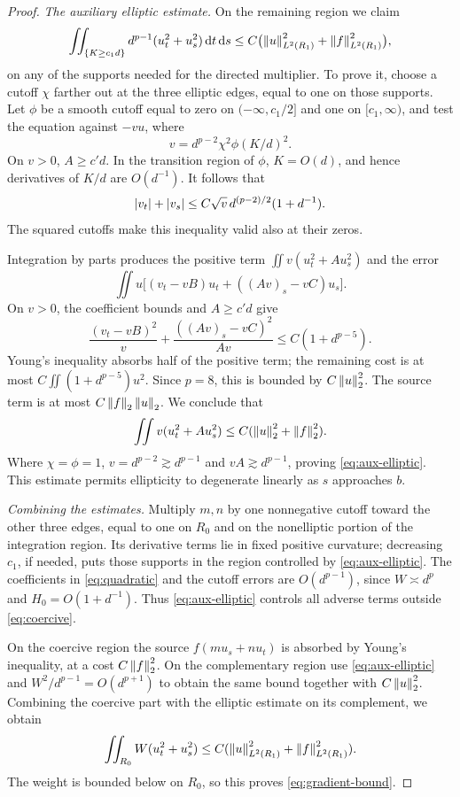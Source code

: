 \begin{proof}
\smallskip
\noindent\emph{The auxiliary elliptic estimate.}
On the remaining region we claim
\begin{equation}\label{eq:aux-elliptic}
\iint_{\{K\ge c_1d\}} d^{p-1}(u_t^2+u_s^2)\,\mathrm d t\,\mathrm d s
\le C\bigl(\left\lVert u\right\rVert_{L^2(R_1)}^2+\left\lVert f\right\rVert_{L^2(R_1)}^2\bigr),
\end{equation}
on any of the supports needed for the directed multiplier.
To prove it, choose a cutoff \(\chi\) farther out at the three
elliptic edges, equal to one on those supports. Let \(\phi\) be
a smooth cutoff equal to zero on \((-\infty,c_1/2]\) and one
on \([c_1,\infty)\), and test the equation against \(-vu\), where
\[
v=d^{p-2}\chi^2\phi(K/d)^2.
\]
On \(v>0\), \(A\ge c'd\). In the transition region of \(\phi\),
\(K=O(d)\), and hence derivatives of \(K/d\) are \(O(d^{-1})\).
It follows that
\[
\left\lvert v_t\right\rvert+\left\lvert v_s\right\rvert
\le C\sqrt v\,d^{(p-2)/2}(1+d^{-1}).
\]
The squared cutoffs make this inequality valid also at their zeros.

Integration by parts produces the positive term
\(\iint v(u_t^2+Au_s^2)\) and the error
\[
\iint u\bigl[(v_t-vB)u_t+((Av)_s-vC)u_s\bigr].
\]
On \(v>0\), the coefficient bounds and \(A\ge c'd\) give
\[
\frac{(v_t-vB)^2}{v}
+\frac{((Av)_s-vC)^2}{Av}
\le C(1+d^{p-5}).
\]
Young's inequality absorbs half of the positive term; the remaining
cost is at most \(C\iint(1+d^{p-5})u^2\).
Since \(p=8\), this is bounded by \(C\left\lVert u\right\rVert_2^2\).
The source term is at most \(C\left\lVert f\right\rVert_2\left\lVert u\right\rVert_2\).
We conclude that
\[
\iint v(u_t^2+Au_s^2)
\le C(\left\lVert u\right\rVert_2^2+\left\lVert f\right\rVert_2^2).
\]
Where \(\chi=\phi=1\), \(v=d^{p-2}\gtrsim d^{p-1}\)
and \(vA\gtrsim d^{p-1}\), proving \eqref{eq:aux-elliptic}.
This estimate permits ellipticity to degenerate linearly as
\(s\) approaches \(b\).

\smallskip
\noindent\emph{Combining the estimates.}
Multiply \(m,n\) by one nonnegative cutoff toward the other three
edges, equal to one on \(R_0\) and on the nonelliptic portion of
the integration region. Its derivative terms lie in fixed positive
curvature; decreasing \(c_1\), if needed, puts those supports
in the region controlled by \eqref{eq:aux-elliptic}.
The coefficients in \eqref{eq:quadratic} and the cutoff errors
are \(O(d^{p-1})\), since \(W\asymp d^p\) and \(H_0=O(1+d^{-1})\).
Thus \eqref{eq:aux-elliptic} controls all adverse terms outside
\eqref{eq:coercive}.

On the coercive region the source \(f(mu_s+nu_t)\) is absorbed by
Young's inequality, at a cost \(C\left\lVert f\right\rVert_2^2\). On the complementary
region use \eqref{eq:aux-elliptic} and
\(W^2/d^{p-1}=O(d^{p+1})\) to obtain the same bound together
with \(C\left\lVert u\right\rVert_2^2\). Combining the coercive part with the
elliptic estimate on its complement, we obtain
\[
\iint_{R_0}W(u_t^2+u_s^2)
\le C(\left\lVert u\right\rVert_{L^2(R_1)}^2+\left\lVert f\right\rVert_{L^2(R_1)}^2).
\]
The weight is bounded below on \(R_0\), so this proves
\eqref{eq:gradient-bound}.


\end{proof}
